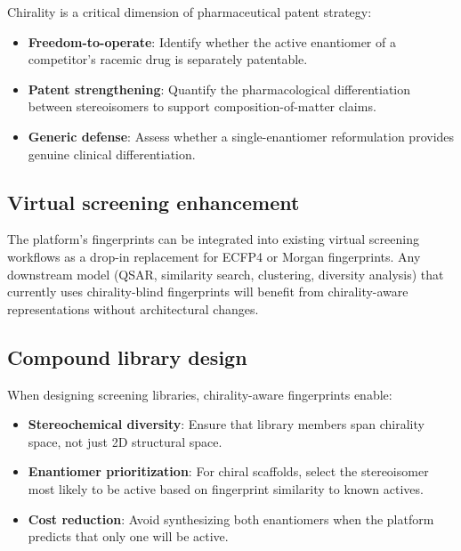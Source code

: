 \documentclass[11pt,a4paper]{article}
\begin{document}
Chirality is a critical dimension of pharmaceutical patent strategy:

\begin{itemize}[leftmargin=1.5em]
  \item \textbf{Freedom-to-operate}: Identify whether the active enantiomer
    of a competitor's racemic drug is separately patentable.
  \item \textbf{Patent strengthening}: Quantify the pharmacological
    differentiation between stereoisomers to support composition-of-matter
    claims.
  \item \textbf{Generic defense}: Assess whether a single-enantiomer
    reformulation provides genuine clinical differentiation.
\end{itemize}

\subsection{Virtual screening enhancement}

The platform's fingerprints can be integrated into existing virtual screening
workflows as a drop-in replacement for ECFP4 or Morgan fingerprints.
Any downstream model (QSAR, similarity search, clustering, diversity analysis)
that currently uses chirality-blind fingerprints will benefit from
chirality-aware representations without architectural changes.

\subsection{Compound library design}

When designing screening libraries, chirality-aware fingerprints enable:

\begin{itemize}[leftmargin=1.5em]
  \item \textbf{Stereochemical diversity}: Ensure that library members span
    chirality space, not just 2D structural space.
  \item \textbf{Enantiomer prioritization}: For chiral scaffolds, select the
    stereoisomer most likely to be active based on fingerprint similarity to
    known actives.
  \item \textbf{Cost reduction}: Avoid synthesizing both enantiomers when
    the platform predicts that only one will be active.
\end{itemize}

\newpage

\end{document}
